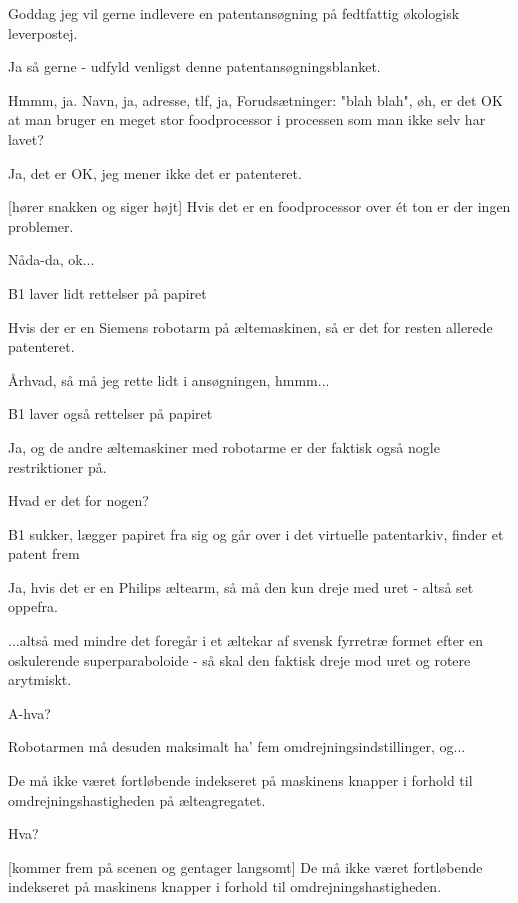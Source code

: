 \documentclass[a4paper,11pt]{article}
\begin{document}
\begin{sketch}
 Goddag jeg vil gerne indlevere en patentansøgning på
fedtfattig økologisk leverpostej.

 Ja så gerne - udfyld venligst denne patentansøgningsblanket.

 Hmmm, ja. 
Navn, ja, adresse, tlf, ja, Forudsætninger: "blah blah", øh, er det OK
at man bruger en meget stor foodprocessor i processen som man ikke
selv har lavet?

 Ja, det er OK, jeg mener ikke det er patenteret. 

 [hører snakken og siger højt] Hvis det er en foodprocessor
over ét ton er der ingen problemer.

 Nåda-da, ok...

\scene B1 laver lidt rettelser på papiret

 Hvis der er en Siemens robotarm på æltemaskinen, så er det
for resten allerede patenteret.

 Århvad, så må jeg rette lidt i ansøgningen, hmmm...

\scene B1 laver også rettelser på papiret

 Ja, og de andre æltemaskiner med robotarme er der faktisk
også nogle restriktioner på.

 Hvad er det for nogen?

\scene B1 sukker, lægger papiret fra sig og går over i det virtuelle
patentarkiv, finder et patent frem

 Ja, hvis det er en Philips æltearm, så må den kun dreje med
uret - altså set oppefra.

 ...altså med mindre det foregår i et æltekar af svensk
fyrretræ formet efter en oskulerende superparaboloide - så skal den
faktisk dreje mod uret og rotere arytmiskt.

 A-hva?

 Robotarmen må desuden maksimalt ha' fem
omdrejningsindstillinger, og...

 De må ikke været fortløbende indekseret på maskinens knapper
i forhold til omdrejningshastigheden på ælteagregatet.

 Hva?

[kommer frem på scenen og gentager langsomt] De må ikke været
fortløbende indekseret på maskinens knapper i forhold til
omdrejningshastigheden.


\end{sketch}
\end{document}
